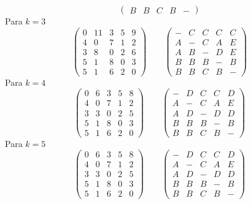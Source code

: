 \documentclass[twoside]{article}
\begin{document}
\begin{solucion}
$$\begin{pmatrix}
B	& B		& C		& B		& -
\end{pmatrix}
$$
Para $k=3$
$$
\begin{pmatrix}
0		& 11	 	& 3 		& 5 		& 9\\
4 		& 0			& 7			& 1			& 2\\
3		& 8			& 0			& 2			& 6\\
5		& 1			& 8			& 0			& 3\\
5		& 1			& 6			& 2			& 0
\end{pmatrix}
\qquad
\begin{pmatrix}
-	& C 	& C 	& C 	& C\\
A	& -		& C		& A		& E\\
A	& B		& -		& D		& E\\
B	& B		& B		& -		& B\\
B	& B		& C		& B		& -
\end{pmatrix}
$$
Para $k=4$
$$
\begin{pmatrix}
0		& 6		 	& 3 		& 5 		& 8\\
4 		& 0			& 7			& 1			& 2\\
3		& 3			& 0			& 2			& 5\\
5		& 1			& 8			& 0			& 3\\
5		& 1			& 6			& 2			& 0
\end{pmatrix}
\qquad
\begin{pmatrix}
-	& D 	& C 	& C 	& D\\
A	& -		& C		& A		& E\\
A	& D		& -		& D		& D\\
B	& B		& B		& -		& B\\
B	& B		& C		& B		& -
\end{pmatrix}
$$
Para $k=5$
$$
\begin{pmatrix}
0		& 6	 		& 3 		& 5 		& 8\\
4 		& 0			& 7			& 1			& 2\\
3		& 3			& 0			& 2			& 5\\
5		& 1			& 8			& 0			& 3\\
5		& 1			& 6			& 2			& 0
\end{pmatrix}
\qquad
\begin{pmatrix}
-	& D		& C 	& C 	& D\\
A	& -		& C		& A		& E\\
A	& D		& -		& D		& D\\
B	& B		& B		& -		& B\\
B	& B		& C		& B		& -
\end{pmatrix}
$$


\end{solucion}
\newpage
\end{document}
